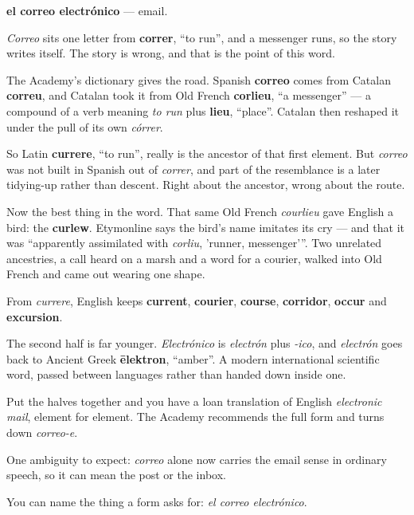 \begin{cousinweb}
\textbf{el correo electrónico} — email.

\emph{Correo} sits one letter from \textbf{correr}, \textquotedblleft{}to run\textquotedblright{}, and a messenger runs, so the story writes itself. The story is wrong, and that is the point of this word.

The Academy's dictionary gives the road. Spanish \textbf{correo} comes from Catalan \textbf{correu}, and Catalan took it from Old French \textbf{corlieu}, \textquotedblleft{}a messenger\textquotedblright{} — a compound of a verb meaning \emph{to run} plus \textbf{lieu}, \textquotedblleft{}place\textquotedblright{}. Catalan then reshaped it under the pull of its own \emph{córrer}.

So Latin \textbf{currere}, \textquotedblleft{}to run\textquotedblright{}, really is the ancestor of that first element. But \emph{correo} was not built in Spanish out of \emph{correr}, and part of the resemblance is a later tidying-up rather than descent. Right about the ancestor, wrong about the route.

Now the best thing in the word. That same Old French \emph{courlieu} gave English a bird: the \textbf{curlew}. Etymonline says the bird's name imitates its cry — and that it was \textquotedblleft{}apparently assimilated with \emph{corliu}, 'runner, messenger'\textquotedblright{}. Two unrelated ancestries, a call heard on a marsh and a word for a courier, walked into Old French and came out wearing one shape.

From \emph{currere}, English keeps \textbf{current}, \textbf{courier}, \textbf{course}, \textbf{corridor}, \textbf{occur} and \textbf{excursion}.

The second half is far younger. \emph{Electrónico} is \emph{electrón} plus \emph{-ico}, and \emph{electrón} goes back to Ancient Greek \textbf{ēlektron}, \textquotedblleft{}amber\textquotedblright{}. A modern international scientific word, passed between languages rather than handed down inside one.

Put the halves together and you have a loan translation of English \emph{electronic mail}, element for element. The Academy recommends the full form and turns down \emph{correo-e}.

One ambiguity to expect: \emph{correo} alone now carries the email sense in ordinary speech, so it can mean the post or the inbox.
\end{cousinweb}

\begin{grammarlens}[title={What you've built}]
You can name the thing a form asks for: \emph{el correo electrónico}.
\end{grammarlens}

